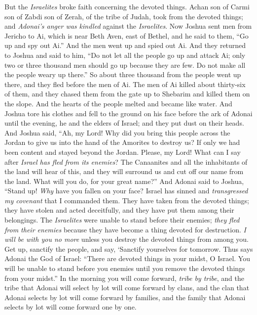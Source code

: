 \begin{biblechapter} %
 But the \textit{Israelites} broke faith concerning the devoted things. Achan son of Carmi son of Zabdi son of Zerah, of the tribe of Judah, took from the devoted things; and \textit{Adonai’s anger was kindled} against the \textit{Israelites}.
\verse Now Joshua sent men from Jericho to Ai, which is near Beth Aven, east of Bethel, and he said to them, “Go up and spy out Ai.” And the men went up and spied out Ai.
\verse And they returned to Joshua and said to him, “Do not let all the people go up and attack Ai; only two or three thousand men should go up because they are few. Do not make all the people weary up there.”
\verse So about three thousand from the people went up there, and they fled before the men of Ai.
\verse The men of Ai killed about thirty-six of them, and they chased them from the gate up to Shebarim and killed them on the slope. And the hearts of the people melted and became like water.
\verse And Joshua tore his clothes and fell to the ground on his face before the ark of Adonai until the evening, he and the elders of Israel; and they put dust on their heads.
\verse And Joshua said, “Ah, my Lord! Why did you bring this people across the Jordan to give us into the hand of the Amorites to destroy us? If only we had been content and stayed beyond the Jordan.
\verse Please, my Lord! What can I say after \textit{Israel has fled from its enemies}?
\verse The Canaanites and all the inhabitants of the land will hear of this, and they will surround us and cut off our name from the land. What will you do, for your great name?”
\verse And Adonai said to Joshua, “Stand up! \textit{Why} have you fallen on your face?
\verse Israel has sinned and \textit{transgressed my covenant} that I commanded them. They have taken from the devoted things; they have stolen and acted deceitfully, and they have put them among their belongings.
\verse The \textit{Israelites} were unable to stand before their enemies; \textit{they fled from their enemies} because they have become a thing devoted for destruction. \textit{I will be with you no more} unless you destroy the devoted things from among you.
\verse Get up, sanctify the people, and say, ‘Sanctify yourselves for tomorrow. Thus says Adonai the God of Israel: “There are devoted things in your midst, O Israel. You will be unable to stand before you enemies until you remove the devoted things from your midst.”
\verse In the morning you will come forward, \textit{tribe by tribe}, and the tribe that Adonai will select by lot will come forward by clans, and the clan that Adonai selects by lot will come forward by families, and the family that Adonai selects by lot will come forward one by one.

\end{biblechapter}
